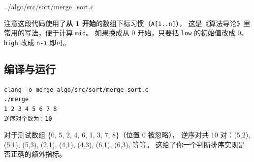 
{../algo/src/sort/merge_sort.c}

注意这段代码使用了\textbf{从 1 开始}的数组下标习惯（\texttt{A[1..n]}），
这是《算法导论》里常用的写法，便于计算 \texttt{mid}。
如果换成从 0 开始，只要把 \texttt{low} 的初始值改成 0、
\texttt{high} 改成 \texttt{n-1} 即可。

\subsection{编译与运行}

\begin{lstlisting}[style=bashstyle]
clang -o merge algo/src/sort/merge_sort.c
./merge
1 2 3 4 5 6 7 8
逆序对个数为：10
\end{lstlisting}

对于测试数组 \{0, 5, 2, 4, 6, 1, 3, 7, 8\}（位置 0 被忽略），
逆序对共 10 对：(5,2), (5,1), (5,3), (2,1), (4,1), (4,3), (6,1), (6,3), 等等。
这给了你一个判断排序实现是否正确的额外指标。
